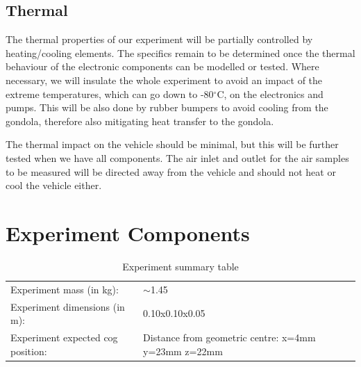 \documentclass[12pt,a4paper]{report}
\newcommand{\degree}{\ensuremath{^\circ}}
\begin{document}
\subsection{Thermal}

The thermal properties of our experiment will be partially controlled by heating/cooling elements. The specifics remain to be determined once the thermal behaviour of the electronic components can be modelled or tested. Where necessary, we will insulate the whole experiment to avoid an impact of the extreme temperatures, which can go down to -80\degree C, on the electronics and pumps. This will be also done by rubber bumpers to avoid cooling from the gondola, therefore also mitigating heat transfer to the gondola.

The thermal impact on the vehicle should be minimal, but this will be further tested when we have all components. The air inlet and outlet for the air samples to be measured will be directed away from the vehicle and should not heat or cool the vehicle either.

\section{Experiment Components}

\begin{table}[H]
\centering
\caption{Experiment summary table}
\label{tab:experiment_summary}
\begin{tabular}{L{6cm}L{6cm}}
\toprule
Experiment mass (in kg): & $\sim$1.45 \\
Experiment dimensions (in m): & 0.10x0.10x0.05\\
Experiment expected \ac{cog} position: & Distance from geometric centre: x=4mm y=23mm z=22mm \\
\bottomrule
\end{tabular}
\end{table}
\end{document}
